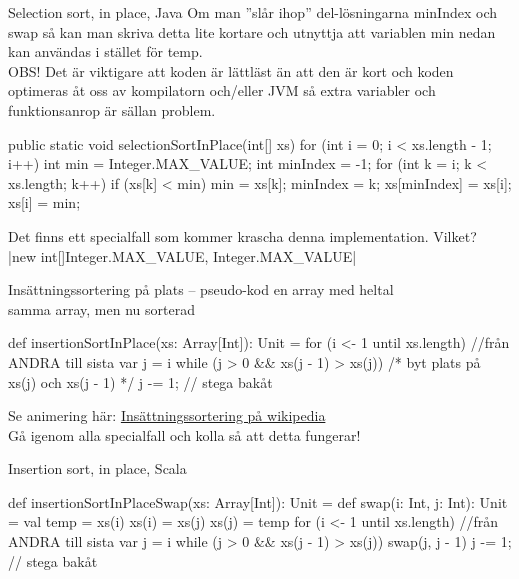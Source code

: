 \begin{Slide}{Selection sort, in place, Java}\SlideFontTiny
Om man ''slår ihop'' del-lösningarna minIndex och swap så kan man skriva detta lite kortare och utnyttja att variablen min nedan kan användas i stället för temp.  \\
OBS! Det är viktigare att koden är lättläst än att den är kort och koden optimeras åt oss av kompilatorn och/eller JVM så extra variabler och funktionsanrop är sällan problem.
\begin{Code}[language=Java,basicstyle=\ttfamily\SlideFontSize{6}{7.5},numberstyle=\ttfamily\SlideFontSize{6}{8}, numbers=left]
public static void selectionSortInPlace(int[] xs) {
    for (int i = 0; i < xs.length - 1; i++) { 
        int min = Integer.MAX_VALUE;
        int minIndex = -1;
        for (int k = i; k < xs.length; k++) {  
            if (xs[k] < min) {
                min = xs[k];
                minIndex = k;
            }
        }
        xs[minIndex] = xs[i]; 
        xs[i] = min;          
    }
}
\end{Code}


\pause Det finns ett specialfall som kommer krascha denna implementation. Vilket?
\pause\\\jcode|new int[]{Integer.MAX_VALUE, Integer.MAX_VALUE}|
\end{Slide}

\begin{Slide}{Insättningssortering på plats -- pseudo-kod}
 en array med heltal\\
 samma array, men nu sorterad\\
\begin{Code}
def insertionSortInPlace(xs: Array[Int]): Unit = {
  for (i <- 1 until xs.length) {  //från ANDRA till sista
    var j = i
    while (j > 0 && xs(j - 1) > xs(j)) {
      /* byt plats på xs(j) och xs(j - 1) */
      j -= 1;  // stega bakåt
    }
  }
}
\end{Code}
\pause
Se animering här: \href{https://sv.wikipedia.org/wiki/Ins\%C3\%A4ttningssortering}{Insättningssortering på wikipedia}\\
Gå igenom alla specialfall och kolla så att detta fungerar!
\end{Slide}

\begin{Slide}{Insertion sort, in place, Scala}
\begin{Code}
def insertionSortInPlaceSwap(xs: Array[Int]): Unit = {
  def swap(i: Int, j: Int): Unit = {
    val temp = xs(i)
    xs(i) = xs(j)
    xs(j) = temp
  }
  for (i <- 1 until xs.length) {  //från ANDRA till sista
    var j = i
    while (j > 0 && xs(j - 1) > xs(j)) {
      swap(j, j - 1)
      j -= 1;  // stega bakåt
    }
  }
}
\end{Code}
\end{Slide}


